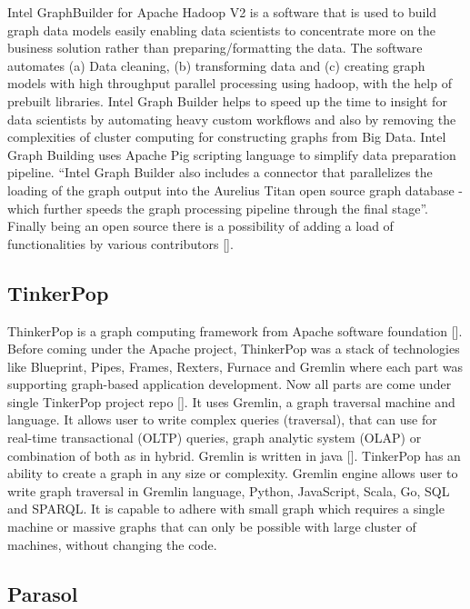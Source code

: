 Intel GraphBuilder for Apache Hadoop V2 is a software that is used to
build graph data models easily enabling data scientists to concentrate
more on the business solution rather than preparing/formatting the
data. The software automates (a) Data cleaning, (b) transforming data and
(c) creating graph models with high throughput parallel processing using
hadoop, with the help of prebuilt libraries. Intel Graph Builder helps
to speed up the time to insight for data scientists by automating
heavy custom workflows and also by removing the complexities of
cluster computing for constructing graphs from Big Data. Intel Graph
Building uses Apache Pig scripting language to simplify data
preparation pipeline.  ``Intel Graph Builder also includes a connector
that parallelizes the loading of the graph output into the Aurelius
Titan open source graph database - which further speeds the graph
processing pipeline through the final stage''.  Finally being an open
source there is a possibility of adding a load of functionalities by
various contributors [\cite{graphbuilder}].

    
\subsection{TinkerPop}
    
ThinkerPop is a graph computing framework from Apache software
foundation [\cite{www-ApacheTinkerPop}]. Before coming under the Apache
project, ThinkerPop was a stack of technologies like Blueprint, Pipes,
Frames, Rexters, Furnace and Gremlin where each part was supporting
graph-based application development. Now all parts are come under
single TinkerPop project repo [\cite{www-news}]. It uses Gremlin, a
graph traversal machine and language. It allows user to write complex
queries (traversal), that can use for real-time transactional (OLTP)
queries, graph analytic system (OLAP) or combination of both as in
hybrid. Gremlin is written in
java [\cite{www-ApacheTinkerPopHome}]. TinkerPop has an ability to
create a graph in any size or complexity. Gremlin engine allows user
to write graph traversal in Gremlin language, Python, JavaScript,
Scala, Go, SQL and SPARQL. It is capable to adhere with small graph
which requires a single machine or massive graphs that can only be
possible with large cluster of machines, without changing the code.

\subsection{Parasol}

